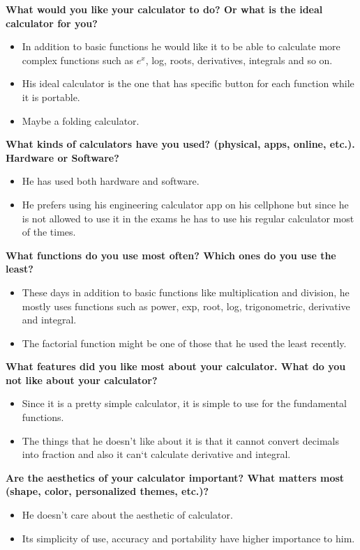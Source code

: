 \documentclass[a4paper]{article}
\begin{document}
\textbf{What would you like your calculator to do? Or what is the ideal calculator for you?}
\begin{itemize}
\itemsep0em 
\item In addition to basic functions he would like it to be able to calculate more complex functions such as $e^x$, log, roots, derivatives, integrals and so on.
\item His ideal calculator is the one that has specific button for each function while it is portable. 
\item Maybe a folding calculator.
\end{itemize}

\textbf{What kinds of calculators have you used? (physical, apps, online, etc.). Hardware or Software?}
\begin{itemize}
\itemsep0em 
\item He has used both hardware and software. 
\item He prefers using his engineering calculator app on his cellphone but since he is not allowed to use it in the exams he has to use his regular calculator most of the times.
\end{itemize}

\textbf{What functions do you use most often? Which ones do you use the least?}
\begin{itemize}
\itemsep0em 
\item These days in addition to basic functions like multiplication and division, he mostly uses functions such as power, exp, root, log, trigonometric, derivative and integral. 
\item The factorial function might be one of those that he used the least recently.
\end{itemize}

\textbf{What features did you like most about your calculator. What do you not like about your calculator?}
\begin{itemize}
\itemsep0em 
\item Since it is a pretty simple calculator, it is simple to use for the fundamental functions. 
\item The things that he doesn't like about it is that it cannot convert decimals into fraction and also it can`t calculate derivative and integral.
\end{itemize}

\textbf{Are the aesthetics of your calculator important? What matters most (shape, color,  personalized themes, etc.)?}
\begin{itemize}
\itemsep0em 
\item He doesn't care about the aesthetic of calculator.
\item Its simplicity of use, accuracy and portability have higher importance to him.
\end{itemize}
\end{document}
